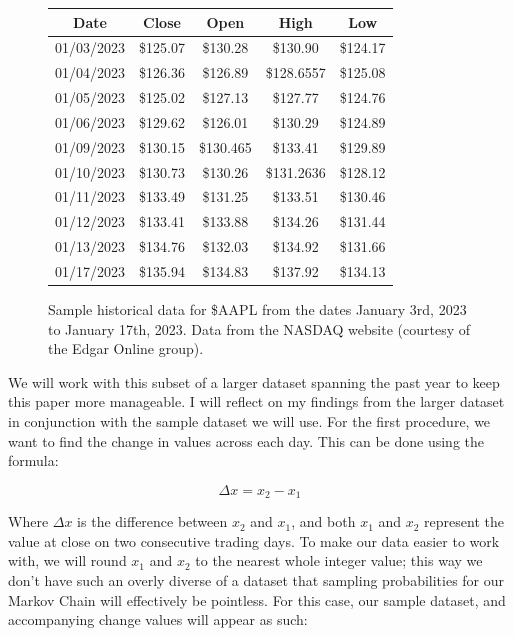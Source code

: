 \documentclass[12pt,final]{article}
\begin{document}
\begin{figure}[H]
  \begin{center}
  \begin{tabular}{| c | c | c | c | c |}
  \hline
  Date & Close & Open & High & Low \\ \hline
  01/03/2023 & \$125.07 & \$130.28 & \$130.90 & \$124.17 \\ \hline
  01/04/2023 & \$126.36 & \$126.89 & \$128.6557 & \$125.08 \\ \hline
  01/05/2023 & \$125.02 & \$127.13 & \$127.77 & \$124.76 \\ \hline
  01/06/2023 & \$129.62 & \$126.01 & \$130.29 & \$124.89 \\ \hline
  01/09/2023 & \$130.15 & \$130.465 & \$133.41 & \$129.89 \\ \hline
  01/10/2023 & \$130.73 & \$130.26 & \$131.2636 & \$128.12 \\ \hline
  01/11/2023 & \$133.49 & \$131.25 & \$133.51 & \$130.46 \\ \hline
  01/12/2023 & \$133.41 & \$133.88 & \$134.26 & \$131.44 \\ \hline
  01/13/2023 & \$134.76 & \$132.03 & \$134.92 & \$131.66 \\ \hline
  01/17/2023 & \$135.94 & \$134.83 & \$137.92 & \$134.13 \\ \hline
  \end{tabular}
  \end{center}
  \caption{Sample historical data for \$AAPL from the dates January 3rd, 2023 to January 17th, 2023. Data from the NASDAQ website (courtesy of the Edgar Online group).}
  \label{fig:samplehistoricaldata10days}
\end{figure}

We will work with this subset of a larger dataset spanning the past year to keep this paper more
manageable. I will reflect on my findings from the larger dataset in conjunction with the sample
dataset we will use. For the first procedure, we want to find the change in values across
each day. This can be done using the formula:

\begin{equation}
	\Delta{x} = x_2 - x_1
	\label{eq:changeincloseequation}
\end{equation}

Where $\Delta{x}$ is the difference between $x_2$ and $x_1$, and both $x_1$ and $x_2$ represent the
value at close on two consecutive trading days. To make our data easier to work with, we will round
$x_1$ and $x_2$ to the nearest whole integer value; this way we don't have such an overly diverse of
a dataset that sampling probabilities for our Markov Chain will effectively be pointless. For this
case, our sample dataset, and accompanying change values will appear as such:
\end{document}
